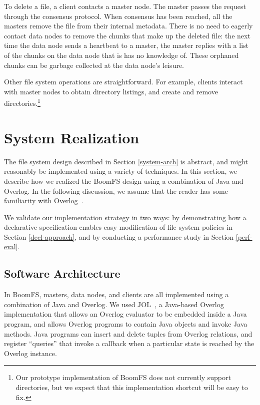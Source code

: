 \documentclass[twocolumn]{article}
\begin{document}
To delete a file, a client contacts a master node. The master passes
the request through the consensus protocol. When consensus has been
reached, all the masters remove the file from their internal
metadata. There is no need to eagerly contact data nodes to remove the
chunks that make up the deleted file: the next time the data node
sends a heartbeat to a master, the master replies with a list of the
chunks on the data node that is has no knowledge of. These orphaned
chunks can be garbage collected at the data node's leisure.

Other file system operations are straightforward. For example, clients
interact with master nodes to obtain directory listings, and create
and remove directories.\footnote{Our prototype implementation of
  BoomFS does not currently support directories, but we expect that
  this implementation shortcut will be easy to fix.}

\section{System Realization}
\label{system-realize}
The file system design described in Section \ref{system-arch} is
abstract, and might reasonably be implemented using a variety of
techniques. In this section, we describe how we realized the BoomFS
design using a combination of Java and Overlog. In the following
discussion, we assume that the reader has some familiarity with
Overlog~\cite{dn-sigmod}.

We validate our implementation strategy in two ways: by demonstrating
how a declarative specification enables easy modification of file
system policies in Section \ref{decl-approach}, and by conducting a
performance study in Section \ref{perf-eval}.

\subsection{Software Architecture}

In BoomFS, masters, data nodes, and clients are all implemented using
a combination of Java and Overlog. We used JOL~\cite{jol}, a
Java-based Overlog implementation that allows an Overlog evaluator to
be embedded inside a Java program, and allows Overlog programs to
contain Java objects and invoke Java methods. Java programs can insert
and delete tuples from Overlog relations, and register ``queries''
that invoke a callback when a particular state is reached by the
Overlog instance.
\end{document}
